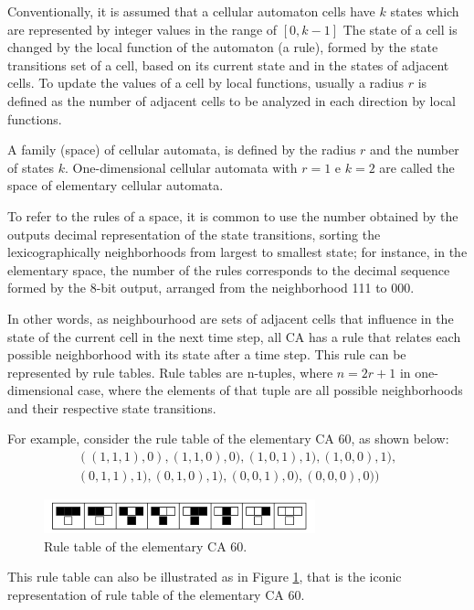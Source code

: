\documentclass{llncs}
\begin{document}
Conventionally, it is assumed that a cellular automaton cells have $k$ states which are represented by integer values in the range of $[0, k-1]$ The state of a cell is changed by the local function of the automaton (a rule), formed by the state transitions set of a cell, based on its current state and in the states of adjacent cells. To update the values of a cell by local functions, usually a radius $r$ is defined as the number of adjacent cells to be analyzed in each direction by local functions.

A family (space) of cellular automata, is defined by the radius $r$ and the number of states $k$. One-dimensional cellular automata with $r=1$ e $k=2$ are called the space of elementary cellular automata.

To refer to the rules of a space, it is common to use the number obtained by the outputs decimal representation  of the state transitions, sorting the lexicographically neighborhoods from largest to smallest state; for instance, in the elementary space, the number of the rules corresponds to the decimal sequence formed by the 8-bit output, arranged from the neighborhood 111 to 000. 

In other words, as neighbourhood are sets of adjacent cells that influence in the state of the current cell in the next time step, all CA has a rule that relates each possible neighborhood with its state after a time step. This rule can be represented by rule tables. Rule tables are n-tuples, where $ n = 2r + 1$  in one-dimensional case, where the elements of that tuple are all possible neighborhoods and their respective state transitions. 

For example, consider the rule table of the elementary CA 60, as shown below:
\begin{displaymath}
\begin{split}
(
(1,1,1),0),(1,1,0),0),(1,0,1),1),(1,0,0),1),\\
(0,1,1),1),(0,1,0),1),(0,0,1),0),(0,0,0),0)
)
\end{split}
\end{displaymath}

\begin{figure}[!t]
  \centering
  \includegraphics[width=0.7\textwidth]{fig_ruleIcon60.png}
  \caption{Rule table of the elementary CA 60.}
  \label{fig:table60}
\end{figure}
This rule table can also be illustrated as in Figure \ref{fig:table60}, that is the iconic representation of rule table of the elementary CA 60.
\end{document}
